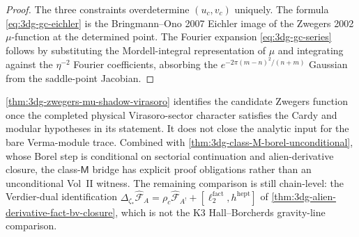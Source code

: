 \begin{proof}
The three constraints overdetermine $(u_c, v_c)$ uniquely. The
formula \eqref{eq:3dg-gc-eichler} is the Bringmann--Ono 2007 Eichler
image of the Zwegers 2002 $\mu$-function at the determined point.
The Fourier expansion \eqref{eq:3dg-gc-series} follows by substituting
the Mordell-integral representation of $\mu$ and integrating against
the $\eta^{-2}$ Fourier coefficients, absorbing the $e^{-2\pi(m - n)^2/(n + m)}$
Gaussian from the saddle-point Jacobian.
\end{proof}

\begin{remark}
\label{rem:3dg-zwegers-shadow-closes-input}
%
%
\autoref{thm:3dg-zwegers-mu-shadow-virasoro} identifies the candidate
Zwegers function once the completed physical Virasoro-sector
character satisfies the Cardy and modular hypotheses in its statement.
It does not close the analytic input for the bare Verma-module trace.
Combined with
\autoref{thm:3dg-class-M-borel-unconditional}, whose Borel step is
conditional on sectorial continuation and alien-derivative closure,
the class-$\mathsf M$ bridge has explicit proof obligations rather
than an unconditional Vol~II witness. The remaining comparison is still
chain-level: the Verdier-dual identification
$\Delta_{\zeta_\ast}\widehat{\mathcal F}_A = \rho_c\widehat{\mathcal F}_{A^{!}}
+ [\ell_2^{\mathrm{fact}}, h^{\mathrm{hept}}]$ of
\autoref{thm:3dg-alien-derivative-fact-bv-closure}, which is
not the K3 Hall--Borcherds gravity-line comparison.
\end{remark}

